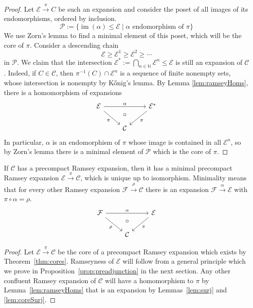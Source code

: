 \documentclass[preprint,12pt]{elsarticle}
\newcommand{\cat}[1]{\mathcal{#1}}
\DeclareMathOperator{\im}{im}
\begin{document}
\begin{proof}
Let $\cat E\xrightarrow{\pi}C$ be such an expansion and consider the poset of all images of its endomorphisms, ordered by inclusion.
$$
\cat P:=\{\im(\alpha)\leq\cat E\mid \alpha\text{ endomorphism of } \pi \}
$$
We use Zorn's lemma to find a minimal element of this poset, which will be the core of $\pi$.
Consider a descending chain 
$$
\cat E\geq \cat E^1\geq \cat E^2\geq \cdots 
$$
in $\cat P$. 
We claim that the intersection $\cat E^* :=\bigcap_{n\in\mathbb{N}}\cat E^n\leq\cat E$ is still an expansion of $\cat C$. Indeed, if $C\in\cat C$, then $\pi^{-1}(C)\cap \cat E^n$ is a sequence of finite nonempty sets, whose intersection is nonempty by K\H{o}nig's lemma.
By Lemma \ref{lem:ramseyHoms}, there is a homomorphism of expansions
    $$
    \begin{tikzcd}
    \cat E \arrow[rd, "\pi"'] \arrow[rr, "\alpha", ""name=alpha] &        &  \cat E^*\arrow[ld, "\pi"] \\
    & \cat C & 
    \arrow[to=2-2, from=alpha, pos=.5, phantom, "\circ"]
    \end{tikzcd}
    $$
In particular, $\alpha$ is an endomorphism of $\pi$ whose image is contained in all $\cat E^n$, so by Zorn's lemma there is a minimal element of $\cat P$ which is the core of $\pi$.
\end{proof}


\begin{cor}
\label{cor:uniqueMinimal}
    If $\cat C$ has a precompact Ramsey expansion, then it has a minimal precompact Ramsey expansion $\cat E\xrightarrow{\pi}\cat C$, which is unique up to isomorphism. Minimality means that for every other Ramsey expansion $\cat F\xrightarrow{\rho}\cat C$ there is an expansion $\cat F\xrightarrow{\alpha}\cat E$ with $\pi\circ\alpha=\rho$.
    $$
    \begin{tikzcd}
    \cat F \arrow[rd, "\rho"'] \arrow[rr, "\alpha", ""name=alpha] &        & \cat E \arrow[ld, "\pi"] \\
    & \cat C &
    \arrow[to=2-2, from=alpha, pos=.5, phantom, "\circ"]
    \end{tikzcd}
    $$
\end{cor}


\begin{proof}
    Let $\cat E\xrightarrow{\pi}\cat C$ be the core of a precompact Ramsey expansion which exists by Theorem~\ref{thm:cores}. Ramseyness of $\cat E$ will follow from a general principle which we prove in Proposition~\ref{prop:preadjunction} in the next section. Any other confluent Ramsey expansion of $\cat C$ will have a homomorphism to $\pi$ by Lemma~\ref{lem:ramseyHoms} that is an expansion by Lemmas~\ref{lem:surj} and \ref{lem:coreSurj}.
\end{proof}
\end{document}
